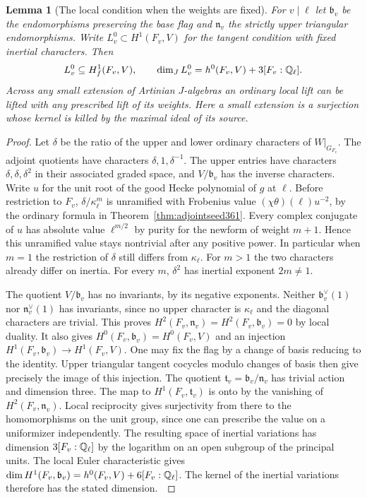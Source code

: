 \documentclass[a4paper,11pt]{article}
\newtheorem{lemma}[proposition]{Lemma}
\theoremstyle{definition}
\theoremstyle{remark}
\numberwithin{equation}{section}
\begin{document}
\begin{lemma}[The local condition when the weights are fixed]
\label{lem:localweight362}
For \(v\mid\ell\) let \(\mathfrak b_v\) be the endomorphisms
preserving the base flag and \(\mathfrak n_v\) the strictly upper
triangular endomorphisms. Write \(L_v^0\subset H^1(F_v,V)\) for
the tangent condition with fixed inertial characters.
Then
\[
 L_v^0\subseteq H^1_f(F_v,V),\qquad
 \dim_J L_v^0=h^0(F_v,V)+3[F_v:\mathbb Q_\ell].
\]
Across any small extension of Artinian \(J\)-algebras an ordinary
local lift can be lifted with any prescribed lift of its weights.
Here a small extension is a surjection whose kernel is killed
by the maximal ideal of its source.
\end{lemma}
\begin{proof}
Let \(\delta\) be the ratio of the upper and lower ordinary
characters of \(W|_{G_{F_v}}\). The adjoint quotients have
characters \(\delta,1,\delta^{-1}\). The upper entries have
characters \(\delta,\delta,\delta^2\) in their associated graded
space, and \(V/\mathfrak b_v\) has the inverse characters.
Write \(u\) for the unit root of the good Hecke polynomial
of \(g\) at \(\ell\). Before restriction to \(F_v\),
\(\delta/\kappa_\ell^m\) is unramified with Frobenius value
\((\chi\theta)(\ell)u^{-2}\), by the ordinary formula in
Theorem~\ref{thm:adjointseed361}. Every complex conjugate of
\(u\) has absolute value \(\ell^{m/2}\) by purity for the
newform of weight \(m+1\). Hence this unramified value stays
nontrivial after any positive power. In particular when \(m=1\)
the restriction of \(\delta\) still differs from
\(\kappa_\ell\). For \(m>1\) the two characters already differ
on inertia. For every \(m\), \(\delta^2\) has inertial
exponent \(2m\ne1\).~\cite{VII-V-VI-deligne40,VII-V-ordinary361}

The quotient \(V/\mathfrak b_v\) has no invariants, by its
negative exponents. Neither
\(\mathfrak b_v^\vee(1)\) nor \(\mathfrak n_v^\vee(1)\) has
invariants, since no upper character is \(\kappa_\ell\) and the
diagonal characters are trivial. This proves
\(H^2(F_v,\mathfrak n_v)=H^2(F_v,\mathfrak b_v)=0\) by local
duality. It also gives \(H^0(F_v,\mathfrak b_v)=H^0(F_v,V)\)
and an injection \(H^1(F_v,\mathfrak b_v)\to H^1(F_v,V)\).
One may fix the flag by a change of basis reducing to the identity.
Upper triangular tangent cocycles modulo changes of basis then
give precisely the image of this injection. The quotient
\(\mathfrak t_v=\mathfrak b_v/\mathfrak n_v\) has trivial action
and dimension three. The map to \(H^1(F_v,\mathfrak t_v)\) is
onto by the vanishing of \(H^2(F_v,\mathfrak n_v)\).
Local reciprocity gives surjectivity from there to the
homomorphisms on the unit group, since one can prescribe the
value on a uniformizer independently. The resulting space of
inertial variations has dimension \(3[F_v:\mathbb Q_\ell]\) by the
logarithm on an open subgroup of the principal units. The local
Euler characteristic gives
\(\dim H^1(F_v,\mathfrak b_v)=h^0(F_v,V)+6[F_v:\mathbb Q_\ell]\).
The kernel of the inertial variations therefore has the stated
dimension.~\cite{VII-V-V-milne98}


\end{proof}
\end{document}

